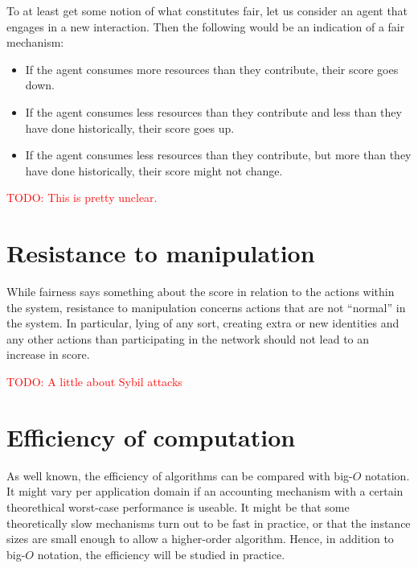 \documentclass[a4paper,11pt]{book}
\newcommand\musthave[1]{\textcolor{red}{TODO: #1}}
\theoremstyle{definition}
\begin{document}
To at least get some notion of what constitutes fair, let us consider an agent that
engages in a new interaction. Then the following would be an indication of a fair mechanism:

\begin{itemize}
    \item If the agent consumes more resources than they contribute, their score goes down.
    \item If the agent consumes less resources than they contribute and less than they have
        done historically, their score goes up.
     \item If the agent consumes less resources than they contribute, but more than they have
        done historically, their score might not change.
\end{itemize}

\musthave{This is pretty unclear.}

\section{Resistance to manipulation}

While fairness says something about the score in relation to the actions within
the system, resistance to manipulation concerns actions that are not ``normal''
in the system. In particular, lying of any sort, creating extra or new identities
and any other actions than participating in the network should not lead to an
increase in score. 

\musthave{A little about Sybil attacks}

\section{Efficiency of computation}

As well known, the efficiency of algorithms can be compared with big-$O$ notation.
It might vary per application domain if an accounting mechanism with a certain
theorethical worst-case performance is useable. It might be that some
theoretically slow mechanisms turn out to be fast in practice, or that the
instance sizes are small enough to allow a higher-order algorithm. Hence,
in addition to big-$O$ notation, the efficiency will be studied in practice.
\end{document}
